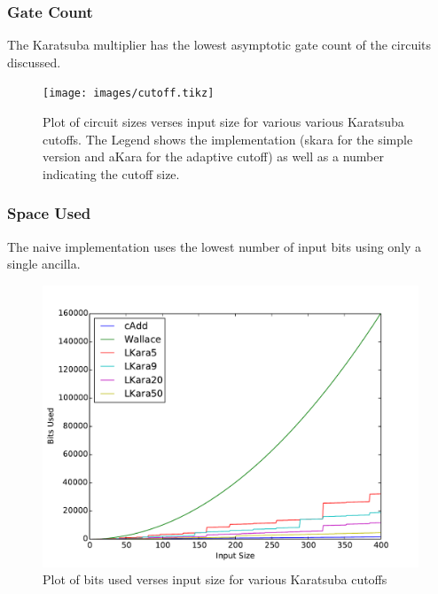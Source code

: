     \subsubsection{Gate Count}
      The Karatsuba multiplier has the lowest asymptotic gate count of the circuits discussed.
     \begin{figure}
        \capstart
        \texttt{[image: images/cutoff.tikz]}
        \caption{Plot of circuit sizes verses input size for various various Karatsuba cutoffs.
                 The Legend shows the implementation (skara for the simple version and aKara for the adaptive cutoff) as well as a number indicating the cutoff size. }
        \label{fig:cutoff}
      \end{figure}


    \subsubsection{Space Used}
      The naive implementation uses the lowest number of input bits using only a single ancilla.
      \begin{figure}
        \capstart
        \includegraphics[width=\textwidth]{images/LKaraSize}
        \caption{Plot of bits used verses input size for various Karatsuba cutoffs}
        \label{fig:size}
      \end{figure}
